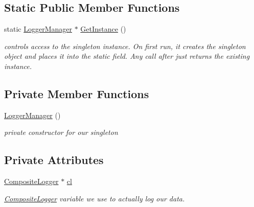 \subsection*{Static Public Member Functions}
\begin{DoxyCompactItemize}
\item 
\mbox{\label{classLoggerManager_a64389dbd7363b4003b64d37ed9f20602}} 
static \hyperlink{classLoggerManager}{Logger\+Manager} $\ast$ \hyperlink{classLoggerManager_a64389dbd7363b4003b64d37ed9f20602}{Get\+Instance} ()
\begin{DoxyCompactList}\small\item\em controls access to the singleton instance. On first run, it creates the singleton object and places it into the static field. Any call after just returns the existing instance. \end{DoxyCompactList}\end{DoxyCompactItemize}
\subsection*{Private Member Functions}
\begin{DoxyCompactItemize}
\item 
\mbox{\label{classLoggerManager_a76aa9e2191e3120990a550e064b2c691}} 
\hyperlink{classLoggerManager_a76aa9e2191e3120990a550e064b2c691}{Logger\+Manager} ()
\begin{DoxyCompactList}\small\item\em private constructor for our singleton \end{DoxyCompactList}\end{DoxyCompactItemize}
\subsection*{Private Attributes}
\begin{DoxyCompactItemize}
\item 
\mbox{\label{classLoggerManager_a25bae278b474c581fd308c03a62e5b54}} 
\hyperlink{classCompositeLogger}{Composite\+Logger} $\ast$ \hyperlink{classLoggerManager_a25bae278b474c581fd308c03a62e5b54}{cl}
\begin{DoxyCompactList}\small\item\em \hyperlink{classCompositeLogger}{Composite\+Logger} variable we use to actually log our data. \end{DoxyCompactList}\end{DoxyCompactItemize}
